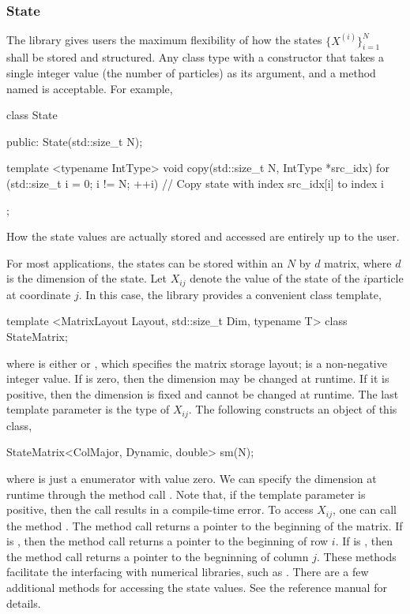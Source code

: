 \documentclass[11pt,bib,mint,hyper,altcolor]{marticle}
\begin{document}
\subsubsection{State}
\label{ssub:State}

The library gives users the maximum flexibility of how the states
$\{X^{(i)}\}_{i=1}^N$ shall be stored and structured. Any class type with a
constructor that takes a single integer value (the number of particles) as its
argument, and a method named  is acceptable. For example,
\begin{cppcode}
  class State
  {
      public:
      State(std::size_t N);

      template <typename IntType>
      void copy(std::size_t N, IntType *src_idx)
      {
          for (std::size_t i = 0; i != N; ++i) {
              // Copy state with index src_idx[i] to index i
          }
      }
  };
\end{cppcode}
How the state values are actually stored and accessed are entirely up to the
user.

For most applications, the states can be stored within an $N$ by $d$ matrix,
where $d$ is the dimension of the state. Let $X_{ij}$ denote the value of the
state of the $i$\ith particle at coordinate $j$. In this case, the library
provides a convenient class template,
\begin{cppcode}
  template <MatrixLayout Layout, std::size_t Dim, typename T>
  class StateMatrix;
\end{cppcode}
where  is either  or
, which specifies the matrix storage layout;
 is a non-negative integer value. If  is zero,
then the dimension may be changed at runtime. If it is positive, then the
dimension is fixed and cannot be changed at runtime. The last template
parameter  is the \cpp type of $X_{ij}$. The following constructs
an object of this class,
\begin{cppcode}
  StateMatrix<ColMajor, Dynamic, double> sm(N);
\end{cppcode}
where  is just a enumerator with value zero. We can specify
the dimension at runtime through the method call .
Note that, if the template parameter  is positive, then the call
results in a compile-time error. To access $X_{ij}$, one can call the method
. The method call  returns a
pointer to the beginning of the matrix. If  is
, then the method call  returns a
pointer to the beginning of row $i$. If  is
, then the method call  returns a
pointer to the begninning of column $j$. These methods facilitate the
interfacing with numerical libraries, such as \blas. There are a few additional
methods for accessing the state values. See the reference manual for details.
\end{document}
